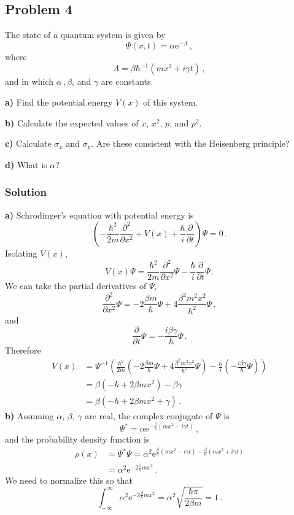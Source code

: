 \documentclass[letterpaper,10pt]{article}
\def\e{\mathrm{e}}
\begin{document}
\subsection*{Problem 4}
The state of a quantum system is given by
\[
\Psi(x,t)=\alpha\e^{-\Lambda}\,,
\]
where
\[
\Lambda=\beta\hbar^{-1}(m x^2+i\gamma t)\,,
\]
and in which $\alpha\,,\beta$, and $\gamma$ are constants.

\textbf{a)} Find the potential energy $V(x)$ of this system.

\textbf{b)} Calculate the expected values of $x$, $x^2$, $p$, and $p^2$.

\textbf{c)} Calculate $\sigma_x$ and $\sigma_p$.  Are these consistent with the
Heisenberg principle?

\textbf{d)} What is $\alpha$?

\subsubsection*{Solution}
\textbf{a)} Schrodinger's equation with potential energy is
\[
\left(-\frac{\hbar^2}{2m}\frac{\partial^2}{\partial
x^2}+V(x)+\frac{\hbar}{i}\frac{\partial}{\partial t}\right)\Psi=0\,.
\]
Isolating $V(x)$,
\[
V(x)\Psi
=\frac{\hbar^2}{2m}\frac{\partial^2}{\partial x^2}\Psi
-\frac{\hbar}{i}\frac{\partial}{\partial t}\Psi\,.
\]
We can take the partial derivatives of $\Psi$,
\[
\frac{\partial^2}{\partial x^2}\Psi=-2\frac{\beta m}{\hbar}\Psi
+4\frac{\beta^2m^2x^2}{\hbar^2}\Psi\,,
\]
and
\[
\frac{\partial}{\partial t}\Psi=-\frac{i\beta\gamma}{\hbar}\Psi\,.
\]
Therefore
\begin{align*}
V(x)&=\Psi^{-1}\left(\frac{\hbar^2}{2m}\left(
-2\frac{\beta m}{\hbar}\Psi+4\frac{\beta^2m^2x^2}{\hbar^2}\Psi\right)
-\frac{\hbar}{i}\left(-\frac{i\beta\gamma}{\hbar}\Psi\right)\right)\\
&=\beta(-h+2\beta m x^2)-\beta\gamma\\
&=\beta(-h+2\beta m x^2+\gamma)\,.
\end{align*}
\textbf{b)} Assuming $\alpha$, $\beta$, $\gamma$ are real, the complex
conjugate of $\Psi$ is
\[
\Psi^*=\alpha\e^{-\frac{\beta}{\hbar}(m x^2-i\gamma t)}\,,
\]
and the probability density function is
\begin{align*}
\rho(x)&=\Psi^*\Psi=\alpha^2\e^{\frac{\beta}{\hbar}(m x^2-i\gamma t)
-\frac{\beta}{\hbar}(m x^2+i\gamma t)}\\
&=\alpha^2\e^{-2\frac{\beta}{\hbar}m x^2}\,.
\end{align*}
We need to normalize this so that
\[
\int_{-\infty}^\infty\alpha^2\e^{-2\frac{\beta}{\hbar}m x^2}
=\alpha^2\sqrt{\frac{\hbar\pi}{2\beta m}}=1\,.
\]
\end{document}
